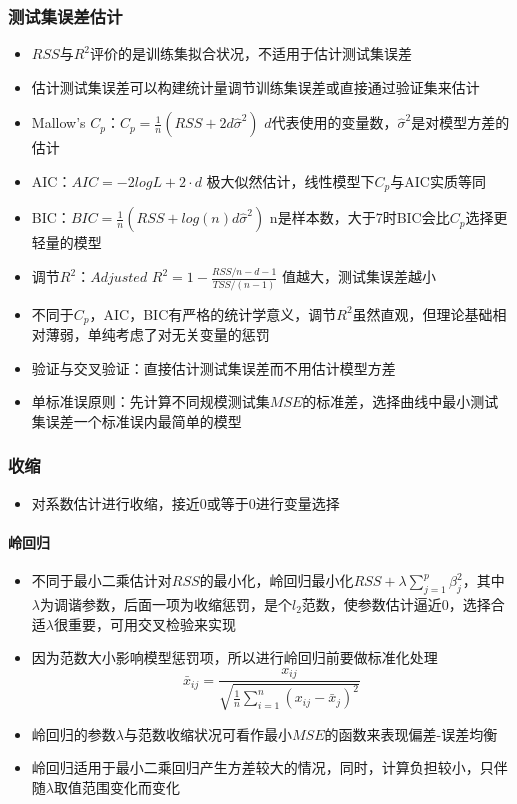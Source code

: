 \documentclass[]{book}
\providecommand{\tightlist}{%
  \setlength{\itemsep}{0pt}\setlength{\parskip}{0pt}}
\let\oldparagraph\paragraph
\renewcommand{\paragraph}[1]{\oldparagraph{#1}\mbox{}}
\begin{document}
\subsubsection{测试集误差估计}

\begin{itemize}
\tightlist
\item
  \(RSS\)与\(R^2\)评价的是训练集拟合状况，不适用于估计测试集误差
\item
  估计测试集误差可以构建统计量调节训练集误差或直接通过验证集来估计
\item
  Mallow's \(C_p\)：\(C_p = \frac{1}{n} (RSS + 2d\hat \sigma^2)\) \(d\)代表使用的变量数，\(\hat \sigma^2\)是对模型方差的估计
\item
  AIC：\(AIC = -2logL + 2 \cdot d\) 极大似然估计，线性模型下\(C_p\)与AIC实质等同
\item
  BIC：\(BIC = \frac{1}{n}(RSS + log(n)d\hat \sigma^2)\) n是样本数，大于7时BIC会比\(C_p\)选择更轻量的模型
\item
  调节\(R^2\)：\(Adjusted\) \(R^2 = 1 - \frac{RSS/n-d-1}{TSS/(n - 1)}\) 值越大，测试集误差越小
\item
  不同于\(C_p\)，AIC，BIC有严格的统计学意义，调节\(R^2\)虽然直观，但理论基础相对薄弱，单纯考虑了对无关变量的惩罚
\item
  验证与交叉验证：直接估计测试集误差而不用估计模型方差
\item
  单标准误原则：先计算不同规模测试集\(MSE\)的标准差，选择曲线中最小测试集误差一个标准误内最简单的模型
\end{itemize}

\subsubsection{收缩}

\begin{itemize}
\tightlist
\item
  对系数估计进行收缩，接近0或等于0进行变量选择
\end{itemize}

\paragraph{岭回归}

\begin{itemize}
\tightlist
\item
  不同于最小二乘估计对\(RSS\)的最小化，岭回归最小化\(RSS + \lambda \sum_{j = 1}^{p} \beta_j^2\)，其中\(\lambda\)为调谐参数，后面一项为收缩惩罚，是个\(l_2\)范数，使参数估计逼近0，选择合适\(\lambda\)很重要，可用交叉检验来实现
\item
  因为范数大小影响模型惩罚项，所以进行岭回归前要做标准化处理\[\bar x_{ij} = \frac{x_{ij}}{\sqrt{\frac{1}{n} \sum_{i = 1}^n (x_{ij} - \bar x_j)^2}}\]
\item
  岭回归的参数\(\lambda\)与范数收缩状况可看作最小\(MSE\)的函数来表现偏差-误差均衡
\item
  岭回归适用于最小二乘回归产生方差较大的情况，同时，计算负担较小，只伴随\(\lambda\)取值范围变化而变化
\end{itemize}
\end{document}
